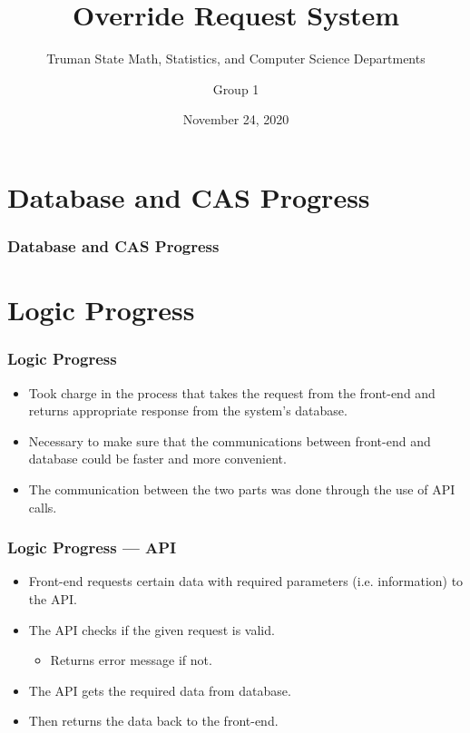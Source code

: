 \documentclass[aspectratio=169, t]{beamer}
\title{Override Request System}
\subtitle{Truman State Math, Statistics, and Computer Science Departments}
\author[Group 1]{Group 1}
\date{November 24, 2020}
\begin{document}
\maketitle

\section{Database and CAS Progress}
\begin{frame}
  \frametitle{Database and CAS Progress}

  

\end{frame}

\section{Logic Progress}
\begin{frame}
  \frametitle{Logic Progress}

\begin{itemize}
    \item Took charge in the process that takes the request from the front-end and returns appropriate response from the system's database.
    \item Necessary to make sure that the communications between front-end and database could be faster and more convenient.
    \item The communication between the two parts was done through the use of API calls.
\end{itemize}

\end{frame}

\begin{frame}
    \frametitle{Logic Progress --- API}

\begin{itemize}
    \item Front-end requests certain data with required parameters (i.e. information) to the API.
    \item The API checks if the given request is valid.
    \begin{itemize}
        \item Returns error message if not.
    \end{itemize}
    \item The API gets the required data from database.
    \item Then returns the data back to the front-end.
\end{itemize}

\end{frame}
\end{document}
